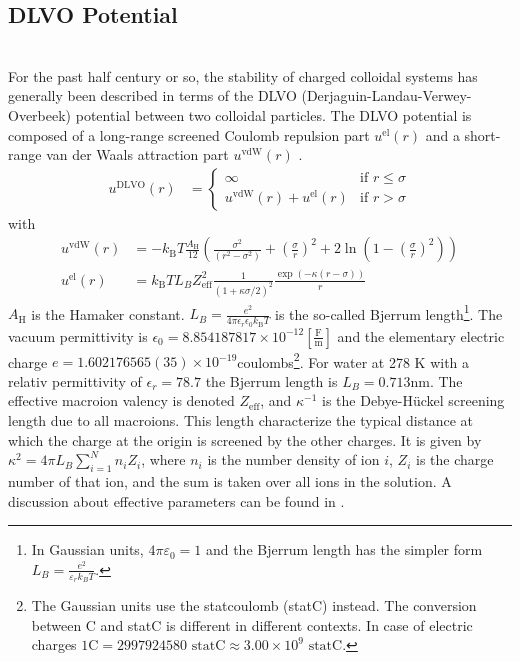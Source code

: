 \newpage
\subsection{DLVO Potential}
~\\

For the past half century or so, the stability of charged
colloidal systems has generally been described in terms of the
DLVO (Derjaguin-Landau-Verwey-Overbeek) potential between
two colloidal particles. The DLVO potential is composed
of a long-range screened Coulomb repulsion part $u^\text{el}(r)$
and a short-range van der Waals attraction part $u^\text{vdW}(r)$
\cite{Naegele1996}.
\begin{align}
u^\text{DLVO}(r) &=
\begin{cases}
\infty                          & \mbox{if } r \leq \sigma \\
u^\text{vdW}(r)+u^\text{el}(r)  & \mbox{if } r >    \sigma
\end{cases}
\end{align}
with
\begin{align}
u^\text{vdW}(r) &= -k_\text{B} T \frac{A_\text{H}}{12} \left(
                  \frac{\sigma^2}{\left(r^2-\sigma^2\right)}
                + \left(\frac{\sigma}{r}\right)^2
                + 2\ln\left(1-\left(\frac{\sigma}{r}\right)^2\right)
                \right) \\
u^\text{el}(r)  &= k_\text{B} T L_B Z_\text{eff}^2
                \frac{1}{\left(1+\kappa\sigma/2\right)^2}
                \frac{\exp\left(-\kappa (r-\sigma)\right)}{r}
\end{align}
$A_\text{H}$ is the Hamaker constant. $L_B=\frac{e^2}{4\pi \epsilon_r \epsilon_0 k_\text{B} T }$
is the so-called Bjerrum length\footnote{In Gaussian units, $4\pi\varepsilon_0 = 1$ and the Bjerrum
length has the simpler form $L_B = \frac{e^2}{\varepsilon_r k_B T}$.}. The vacuum permittivity is
$\epsilon_0= 8.854 187 817 \times 10^{-12} \left[\frac{\text{F}}{\text{m}}\right]$ and the elementary
electric charge $e=1.602176565(35)\times 10^{-19}$coulombs\footnote{The Gaussian units use
the statcoulomb (statC) instead. The conversion between C and statC is different in different contexts.
In case of electric charges $1\text{C} = 2997924580 \text{ statC} \approx 3.00\times 10^9 \text{ statC}$.}.
For water at 278 K with a relativ permittivity of $\epsilon_r=78.7$ the Bjerrum length is $L_B=0.713$nm.
The effective macroion valency is denoted $Z_\text{eff}$, and $\kappa^{-1}$ is the Debye-H\"uckel screening length
due to all macroions. This length characterize the typical distance at which the charge at the origin is screened
by the other charges. It is given by $\kappa^{2}= 4\pi L_B \sum_{i=1}^N n_i Z_i$, where $n_i$ is the number density
of ion $i$, $Z_i$ is the charge number of that ion, and the sum is taken over all ions in the
solution. A discussion about effective parameters can be found in \cite{Alexander1984,Ulander2001}.

